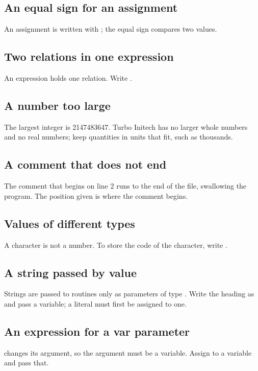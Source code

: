 \subsection{An equal sign for an assignment}
An assignment is written with \code{:=}; the equal sign compares two values.

\subsection{Two relations in one expression}
An expression holds one relation.  Write .

\subsection{A number too large}
The largest integer is 2147483647.  Turbo Initech has no larger whole
numbers and no real numbers; keep quantities in units that fit, such as
thousands.

\subsection{A comment that does not end}
The comment that begins on line 2 runs to the end of the file, swallowing
the program.  The position given is where the comment begins.

\subsection{Values of different types}
A character is not a number.  To store the code of the character, write
.

\subsection{A string passed by value}
Strings are passed to routines only as  parameters of type
.  Write the heading as  and
pass a  variable; a literal must first be assigned to one.

\subsection{An expression for a var parameter}
 changes its argument, so the argument must be a variable.  Assign
 to a variable and pass that.

